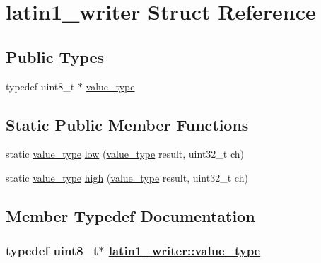 \hypertarget{structlatin1__writer}{
\section{latin1\_\-writer Struct Reference}
\label{structlatin1__writer}
}
\subsection*{Public Types}
\begin{CompactItemize}
\item 
typedef uint8\_\-t $\ast$ \hyperlink{structlatin1__writer_f9228600fa7eecd793cc3d927d46eb1a}{value\_\-type}
\end{CompactItemize}
\subsection*{Static Public Member Functions}
\begin{CompactItemize}
\item 
static \hyperlink{structlatin1__writer_f9228600fa7eecd793cc3d927d46eb1a}{value\_\-type} \hyperlink{structlatin1__writer_b5d7a833d29d66031420686ca67b1f6e}{low} (\hyperlink{structlatin1__writer_f9228600fa7eecd793cc3d927d46eb1a}{value\_\-type} result, uint32\_\-t ch)
\item 
static \hyperlink{structlatin1__writer_f9228600fa7eecd793cc3d927d46eb1a}{value\_\-type} \hyperlink{structlatin1__writer_0e48c306ebe556f267404a9624f00554}{high} (\hyperlink{structlatin1__writer_f9228600fa7eecd793cc3d927d46eb1a}{value\_\-type} result, uint32\_\-t ch)
\end{CompactItemize}


\subsection{Member Typedef Documentation}
\hypertarget{structlatin1__writer_f9228600fa7eecd793cc3d927d46eb1a}{
\subsubsection[value\_\-type]{\setlength{\rightskip}{0pt plus 5cm}typedef uint8\_\-t$\ast$ \hyperlink{structlatin1__writer_f9228600fa7eecd793cc3d927d46eb1a}{latin1\_\-writer::value\_\-type}}}
\label{structlatin1__writer_f9228600fa7eecd793cc3d927d46eb1a}




